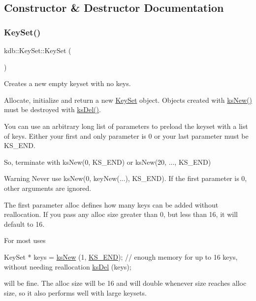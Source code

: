 \subsection{Constructor \& Destructor Documentation}
\mbox{\label{classkdb_1_1KeySet_a4eac9850fa4f06c07a5306befc3e4377}} 
\subsubsection{\texorpdfstring{Key\+Set()}{KeySet()}\hspace{0.1cm}{\footnotesize\ttfamily [1/5]}}
{\footnotesize\ttfamily kdb\+::\+Key\+Set\+::\+Key\+Set (\begin{DoxyParamCaption}{ }\end{DoxyParamCaption})\hspace{0.3cm}{\ttfamily [inline]}}



Creates a new empty keyset with no keys. 

Allocate, initialize and return a new \hyperlink{classkdb_1_1KeySet}{Key\+Set} object. Objects created with \hyperlink{group__keyset_ga671e1aaee3ae9dc13b4834a4ddbd2c3c}{ks\+New()} must be destroyed with \hyperlink{group__keyset_ga27e5c16473b02a422238c8d970db7ac8}{ks\+Del()}.

You can use an arbitrary long list of parameters to preload the keyset with a list of keys. Either your first and only parameter is 0 or your last parameter must be K\+S\+\_\+\+E\+ND.

So, terminate with ks\+New(0, K\+S\+\_\+\+E\+N\+D) or ks\+New(20, ..., K\+S\+\_\+\+E\+ND)

\begin{DoxyWarning}{Warning}
Never use ks\+New(0, key\+New(...), K\+S\+\_\+\+E\+ND). If the first parameter is 0, other arguments are ignored.
\end{DoxyWarning}
The first parameter {\ttfamily alloc} defines how many keys can be added without reallocation. If you pass any alloc size greater than 0, but less than 16, it will default to 16.

For most uses


\begin{DoxyCodeInclude}
KeySet * keys = \hyperlink{group__keyset_ga671e1aaee3ae9dc13b4834a4ddbd2c3c}{ksNew} (1, \hyperlink{group__keyset_ga7a28fce3773b2c873c94ac80b8b4cd54}{KS\_END});
\textcolor{comment}{// enough memory for up to 16 keys, without needing reallocation}
\hyperlink{group__keyset_ga27e5c16473b02a422238c8d970db7ac8}{ksDel} (keys);
\end{DoxyCodeInclude}
 will be fine. The alloc size will be 16 and will double whenever size reaches alloc size, so it also performs well with large keysets.

